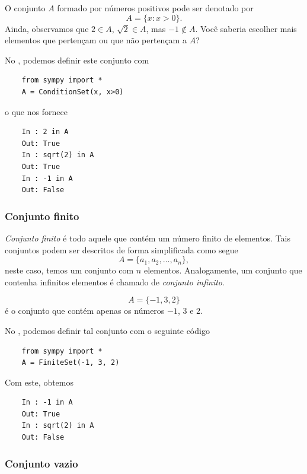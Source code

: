 \begin{ex}
  O conjunto $A$ formado por números positivos pode ser denotado por
  \begin{equation}
    A = \{x: x>0\}.
  \end{equation}
  Ainda, observamos que $2\in A$, $\sqrt{2}\in A$, mas $-1\not\in A$. Você saberia escolher mais elementos que pertençam ou que não pertençam a $A$?

  \ifispython
  No \python, podemos definir este conjunto com
  \begin{lstlisting}
    from sympy import *
    A = ConditionSet(x, x>0)
  \end{lstlisting}
  o que nos fornece
  \begin{lstlisting}
    In : 2 in A
    Out: True
    In : sqrt(2) in A
    Out: True
    In : -1 in A
    Out: False
  \end{lstlisting}
  \fi
\end{ex}

\subsubsection{Conjunto finito}

\emph{Conjunto finito} é todo aquele que contém um número finito de elementos. Tais conjuntos podem ser descritos de forma simplificada como segue
\begin{equation}
  A = \{a_1, a_2, \ldots, a_n\},
\end{equation}
neste caso, temos um conjunto com $n$ elementos. Analogamente, um conjunto que contenha infinitos elementos é chamado de \emph{conjunto infinito}.

\begin{obs}
  \begin{equation}
    A = \{-1,3,2\}
  \end{equation}
  é o conjunto que contém apenas os números $-1$, $3$ e $2$.

  \ifispython
  No \python, podemos definir tal conjunto com o seguinte código
  \begin{lstlisting}
    from sympy import *
    A = FiniteSet(-1, 3, 2)
  \end{lstlisting}
  Com este, obtemos
  \begin{lstlisting}
    In : -1 in A
    Out: True
    In : sqrt(2) in A
    Out: False
  \end{lstlisting}
  \fi
\end{obs}

\subsubsection{Conjunto vazio}

